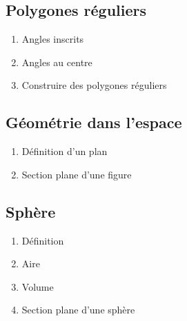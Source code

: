 \subsection{Polygones réguliers}\label{ch_3_poly}

\begin{enumerate}
	\item Angles inscrits
	\item Angles au centre
	\item Construire des polygones réguliers
\end{enumerate}

\subsection{Géométrie dans l'espace}\label{ch_3_space}

\begin{enumerate}
	\item Définition d'un plan
	\item Section plane d'une figure
\end{enumerate}

\subsection{Sphère}\label{ch_3_sphere}

\begin{enumerate}
	\item Définition
	\item Aire
	\item Volume
	\item Section plane d'une sphère
\end{enumerate}